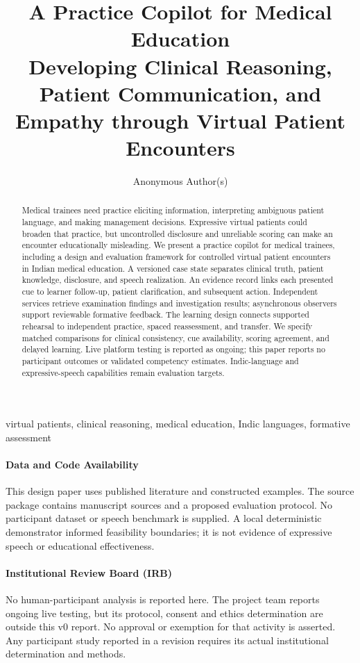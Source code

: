 \documentclass[pmlr,twocolumn,10pt]{jmlr}
\title[A Practice Copilot for Medical Education]{A Practice Copilot for Medical Education\\Developing Clinical Reasoning, Patient Communication, and Empathy through Virtual Patient Encounters}
\author{Anonymous Author(s)}
\begin{document}
\maketitle
\begin{abstract}
Medical trainees need practice eliciting information, interpreting ambiguous patient language, and making management decisions. Expressive virtual patients could broaden that practice, but uncontrolled disclosure and unreliable scoring can make an encounter educationally misleading. We present a practice copilot for medical trainees, including a design and evaluation framework for controlled virtual patient encounters in Indian medical education. A versioned case state separates clinical truth, patient knowledge, disclosure, and speech realization. An evidence record links each presented cue to learner follow-up, patient clarification, and subsequent action. Independent services retrieve examination findings and investigation results; asynchronous observers support reviewable formative feedback. The learning design connects supported rehearsal to independent practice, spaced reassessment, and transfer. We specify matched comparisons for clinical consistency, cue availability, scoring agreement, and delayed learning. Live platform testing is reported as ongoing; this paper reports no participant outcomes or validated competency estimates. Indic-language and expressive-speech capabilities remain evaluation targets.
\end{abstract}
\begin{keywords}virtual patients, clinical reasoning, medical education, Indic languages, formative assessment\end{keywords}
\paragraph*{Data and Code Availability}
This design paper uses published literature and constructed examples. The source package contains manuscript sources and a proposed evaluation protocol. No participant dataset or speech benchmark is supplied. A local deterministic demonstrator informed feasibility boundaries; it is not evidence of expressive speech or educational effectiveness.
\paragraph*{Institutional Review Board (IRB)}
No human-participant analysis is reported here. The project team reports ongoing live testing, but its protocol, consent and ethics determination are outside this v0 report. No approval or exemption for that activity is asserted. Any participant study reported in a revision requires its actual institutional determination and methods.
\end{document}
